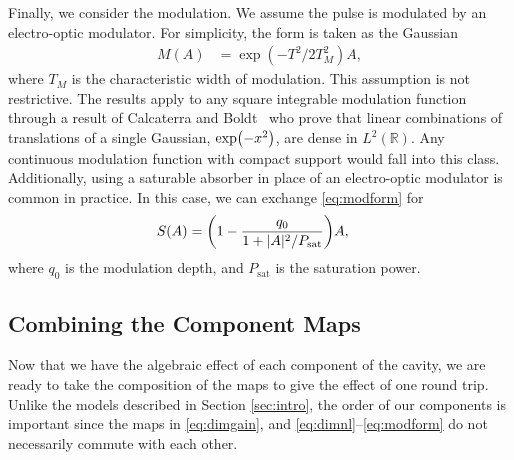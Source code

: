 \documentclass[9pt,twocolumn,twoside]{osajnl}
\let\originalleft\left
\let\originalright\right
\renewcommand{\left}{\mathopen{}\mathclose\bgroup\originalleft}
\renewcommand{\right}{\aftergroup\egroup\originalright}
\begin{document}
Finally, we consider the modulation. We assume the pulse is modulated by an electro-optic modulator. For simplicity, the form is taken as the Gaussian
\begin{align}
	M(A) &= \exp( -T^2 / 2 T_M^2 ) A,
	\label{eq:modform}
\end{align}
where $T_M$ is the characteristic width of modulation. This assumption is not restrictive. The results apply to any square integrable modulation function through a result of Calcaterra and Boldt~\cite{calcaterra2008a} who prove that linear combinations of translations of a single Gaussian, $\exp \left( -x^2 \right)$, are dense in $L^2(\mathbb{R})$. Any continuous modulation function with compact support would fall into this class. Additionally, using a saturable absorber in place of an electro-optic modulator is common in practice. In this case, we can exchange \eqref{eq:modform} for~\cite{lapre2019, meng2020, oktem2010, woodward2018}
\begin{align}
	S(A) &= \left( 1 - \frac{q_0}{1 + |A|^2 / P_\text{sat}} \right) A,
\end{align}
where $q_0$ is the modulation depth, and $P_\text{sat}$ is the saturation power.

\subsection{Combining the Component Maps}
\label{sec:effects}
Now that we have the algebraic effect of each component of the cavity, we are ready to take the composition of the maps to give the effect of one round trip. Unlike the models described in Section \ref{sec:intro}, the order of our components is important since the maps in \eqref{eq:dimgain}, and \eqref{eq:dimnl}--\eqref{eq:modform} do not necessarily commute with each other.
\end{document}
